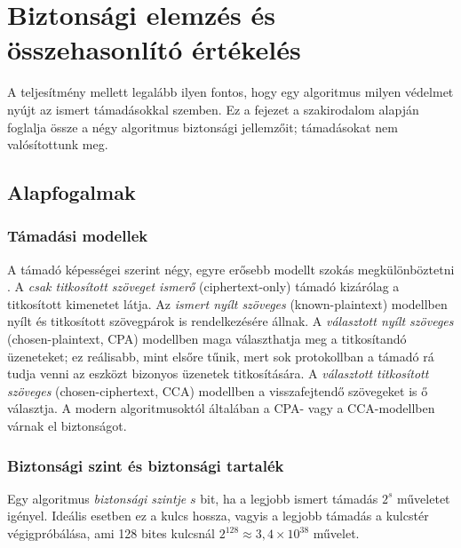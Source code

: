 \documentclass[a4paper,12pt]{report}
\theoremstyle{definition}
\theoremstyle{remark}
\begin{document}
\chapter{Biztonsági elemzés és összehasonlító értékelés}\label{chap:biztonsag}

A teljesítmény mellett legalább ilyen fontos, hogy egy algoritmus milyen védelmet nyújt az ismert támadásokkal szemben. Ez a fejezet a szakirodalom alapján foglalja össze a négy algoritmus biztonsági jellemzőit; támadásokat nem valósítottunk meg.

\section{Alapfogalmak}\label{sec:kriptoanalizis_alap}

\subsection{Támadási modellek}

A támadó képességei szerint négy, egyre erősebb modellt szokás megkülönböztetni \cite{Stallings2017}. A \emph{csak titkosított szöveget ismerő} (ciphertext-only) támadó kizárólag a titkosított kimenetet látja. Az \emph{ismert nyílt szöveges} (known-plaintext) modellben nyílt és titkosított szövegpárok is rendelkezésére állnak. A \emph{választott nyílt szöveges} (chosen-plaintext, CPA) modellben maga választhatja meg a titkosítandó üzeneteket; ez reálisabb, mint elsőre tűnik, mert sok protokollban a támadó rá tudja venni az eszközt bizonyos üzenetek titkosítására. A \emph{választott titkosított szöveges} (chosen-ciphertext, CCA) modellben a visszafejtendő szövegeket is ő választja. A modern algoritmusoktól általában a CPA- vagy a CCA-modellben várnak el biztonságot.

\subsection{Biztonsági szint és biztonsági tartalék}

Egy algoritmus \emph{biztonsági szintje} $s$ bit, ha a legjobb ismert támadás $2^s$ műveletet igényel. Ideális esetben ez a kulcs hossza, vagyis a legjobb támadás a kulcstér végigpróbálása, ami 128 bites kulcsnál $2^{128} \approx 3{,}4 \times 10^{38}$ művelet.
\end{document}
